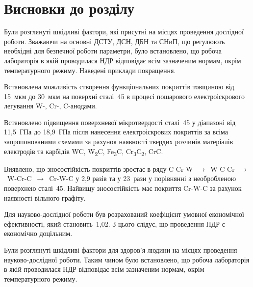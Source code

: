 \documentclass[a4paper,fontsize=14bp,ukrainian]{extreport}
\begin{document}
\section{Висновки до розділу~\thechapter}

Були розглянуті шкідливі фактори, які присутні на місцях проведення дослідної роботи. Зважаючи на основні ДСТУ, ДСН, ДБН та СНиП, що регулюють необхідні для безпечної роботи параметри, було встановлено, що робоча лабораторія в якій проводилася НДР відповідає всім зазначеним нормам, окрім температурного режиму. Наведені приклади покращення.


Встановлена можливість створення функціональних покриттів товщиною від 15~мкм до 30~мкм на поверхні сталі~45 в процесі пошарового електроіскрового легування W-, Cr-, C-анодами.

Встановлено підвищення поверхневої мікротвердості сталі~45 у діапазоні від 11,5~ГПа до 18,9~ГПа після нанесення електроіскрових покриттів за всіма запропонованими схемами за рахунок наявності твердих розчинів матеріалів електродів та карбідів WC, W\textsubscript{2}C, Fe\textsubscript{3}C, Cr\textsubscript{3}C\textsubscript{2}, CrC.

Виявлено, що зносостійкість покриттів зростає в ряду C-Cr-W~$\rightarrow$~W-C-Cr~$\rightarrow$~W-Cr-C~$\rightarrow$~Cr-W-C у 2,9 разів та у 23~рази у порівнянні з необробленою поверхнею сталі~45. Найвищу зносостійкість має покриття Cr-W-C за рахунок наявності вільного графіту.

Для науково-дослідної роботи був розрахований коефіцієнт умовної економічної ефективності, який становить~1,02. З цього слідує, що проведення НДР є економічно доцільним.

Були розглянуті шкідливі фактори для здоров'я людини на місцях проведення науково-дослідної роботи. Таким чином було встановлено, що робоча лабораторія в якій проводилася НДР відповідає всім зазначеним нормам, окрім температурного режиму.

\end{document}
